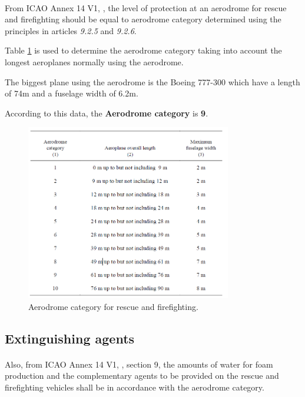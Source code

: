 		\paragraph{} From ICAO Annex 14 V1, \cite{Standards2016}, the level of protection at an aerodrome for rescue and firefighting should be equal to aerodrome category determined using the principles in articles \textit{9.2.5} and \textit{9.2.6}.
		
		Table \ref{table91} is used to determine the aerodrome category taking into account the longest aeroplanes normally using the aerodrome.
		
		The biggest plane using the aerodrome is the Boeing 777-300 which have a length of 74m and a fuselage width of 6.2m.
		
		According to this data, the \textbf{Aerodrome category} is \textbf{9}.
		
		\begin{figure}[H]
			\centering
			\includegraphics[clip, trim=0cm 0cm 0cm 0cm, width=0.8\textwidth]{./images/firefighting/table91}
			\caption{Aerodrome category for rescue and firefighting.}
			\label{table91}
		\end{figure}
	
		\subsection{Extinguishing agents}
		\paragraph{} Also, from ICAO Annex 14 V1, \cite{Standards2016}, section 9, the amounts of water for foam production and the complementary agents to be provided on the rescue and firefighting vehicles shall be in accordance with the aerodrome category.
		
